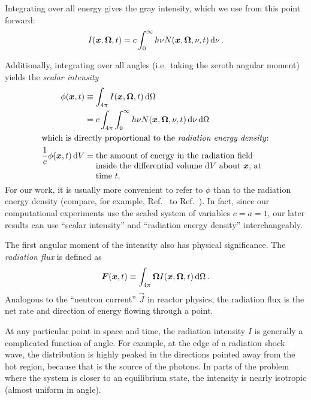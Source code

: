 Integrating over all energy gives the gray intensity, which we use from this point forward:
\begin{equation*}
  I(\bm{x},\bm{\Omega}, t)
  = c \int_0^\infty h\nu N(\bm{x},\bm{\Omega},\nu, t) \mathop{}\!\mathrm{d}\nu \,.
\end{equation*}

Additionally, integrating over all angles (i.e.~taking the zeroth angular
moment) yields the \emph{scalar intensity}
\begin{align} \label{eq:intensityZeroth}
  \phi(\vec{x},t) &\equiv \int_{4\pi} I(\vec{x},\vec{\Omega}, t) \ud \Omega
  \\
  &= c \int_{4\pi} \int_0^\infty h\nu N(\vec{x},\vec{\Omega},\nu, t) \ud\nu
   \ud \Omega
\\ \intertext{which is directly proportional to the \emph{radiation energy
density}:}
\nonumber
\frac{1}{c} \phi(\vec{x},t) \ud V
&= \topbox{the amount of energy in the radiation field inside the differential
  volume $\ud V$ about $\vec{x}$, at time $t$.}
\end{align}
For our work, it is usually more convenient to refer to $\phi$ than to the
radiation energy density (compare, for example, Ref.~\cite{Den2007} to
Ref.~\cite{Kno1999a}). In fact, since our computational experiments use the
scaled system of variables $c=a=1$, our later results can use ``scalar
intensity'' and ``radiation energy density'' interchangeably.

The first angular moment of the intensity also has physical significance. The
\emph{radiation flux} is defined as
\begin{equation} \label{eq:intensityFirst}
  \bm{F}(\bm{x},t) \equiv \int_{4\pi} \bm{\Omega}
  I(\bm{x},\bm{\Omega}, t) \mathop{}\!\mathrm{d} \Omega \,.
\end{equation}
Analogous to the ``neutron current'' $\vec{J}$ in reactor physics, the
radiation flux is the net rate and direction of energy flowing through a point.

At any particular point in space and time, the radiation intensity $I$ is
generally a complicated function of angle.
For example, at the edge of a
radiation shock wave, the distribution is highly peaked in the directions
pointed away from the hot region, because that is the source of the photons. In
parts of the problem where the system is closer to an equilibrium state,
the intensity is nearly isotropic (almost uniform in angle).

